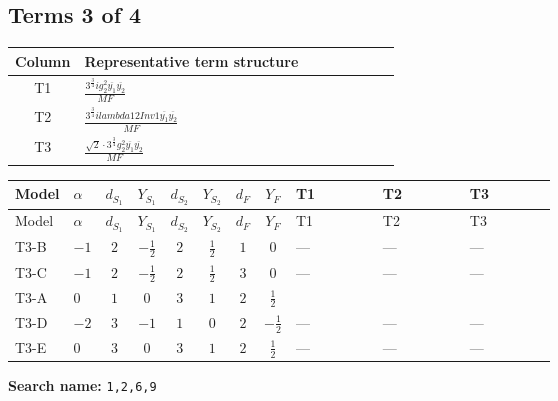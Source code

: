 \documentclass[8pt]{article}
\begin{document}
\begin{landscape}
\subsection*{Terms 3 of 4}
\begin{center}
\begin{tabular}{@{}c >{\raggedright\arraybackslash}p{0.82\linewidth}@{}}
\toprule
Column & Representative term structure \\
\midrule
T1 & \(\displaystyle \frac{3^{\frac{3}{4}} i g_{2}^{2} \overline{y_{1}} \overline{y_{2}}}{MF}\) \\
\midrule
T2 & \(\displaystyle \frac{3^{\frac{3}{4}} i lambda12Inv1 \overline{y_{1}} \overline{y_{2}}}{MF}\) \\
\midrule
T3 & \(\displaystyle \frac{\sqrt{2} \cdot 3^{\frac{3}{4}} g_{2}^{2} \overline{y_{1}} \overline{y_{2}}}{MF}\) \\
\midrule
\bottomrule
\end{tabular}
\end{center}
\smallskip
\tiny
\begin{longtable}{@{}llcccccc >{\raggedright\arraybackslash}p{0.21\linewidth} >{\raggedright\arraybackslash}p{0.21\linewidth} >{\raggedright\arraybackslash}p{0.21\linewidth}@{}}
\toprule
Model & $\alpha$ & $d_{S_1}$ & $Y_{S_1}$ & $d_{S_2}$ & $Y_{S_2}$ & $d_F$ & $Y_F$ & T1 & T2 & T3 \\
\midrule
\endfirsthead
\toprule
Model & $\alpha$ & $d_{S_1}$ & $Y_{S_1}$ & $d_{S_2}$ & $Y_{S_2}$ & $d_F$ & $Y_F$ & T1 & T2 & T3 \\
\midrule
\endhead
T3-B & $-1$ & $2$ & $-\frac{1}{2}$ & $2$ & $\frac{1}{2}$ & $1$ & $0$ & --- & --- & --- \\
\midrule
T3-C & $-1$ & $2$ & $-\frac{1}{2}$ & $2$ & $\frac{1}{2}$ & $3$ & $0$ & --- & --- & --- \\
\midrule
T3-A & $0$ & $1$ & $0$ & $3$ & $1$ & $2$ & $\frac{1}{2}$ & \scriptsize\adjustbox{max width=\linewidth}{$\begin{gathered} - \frac{25 \cdot 3^{\frac{3}{4}} i g_{2}^{2} \overline{y_{1}} \overline{y_{2}}}{24 MF}\end{gathered}$} & \scriptsize\adjustbox{max width=\linewidth}{$\begin{gathered} - \frac{3^{\frac{3}{4}} i lambda12Inv1 \overline{y_{1}} \overline{y_{2}}}{6 MF}\end{gathered}$} & \scriptsize\adjustbox{max width=\linewidth}{$\begin{gathered} - \frac{\sqrt{2} \cdot 3^{\frac{3}{4}} g_{2}^{2} \overline{y_{1}} \overline{y_{2}}}{6 MF}\end{gathered}$} \\
\midrule
T3-D & $-2$ & $3$ & $-1$ & $1$ & $0$ & $2$ & $-\frac{1}{2}$ & --- & --- & --- \\
\midrule
T3-E & $0$ & $3$ & $0$ & $3$ & $1$ & $2$ & $\frac{1}{2}$ & --- & --- & --- \\
\midrule
\bottomrule
\end{longtable}
\clearpage
\noindent\textbf{Search name: }\texttt{1,2,6,9}\par\smallskip

\end{landscape}
\end{document}
